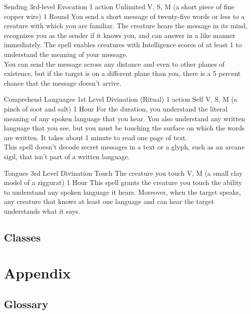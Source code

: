 \documentclass[10pt,twoside,twocolumn,openany,nomultitoc]{book}
\begin{document}
    \DndSpellHeader%
      {Sending}
      {3rd-level Evocation}
      {1 action}
      {Unlimited}
      {V, S, M (a short piece of fine copper wire)}
      {1 Round}
            You send a short message of twenty-five words or less to a creature with which you are familiar. The creature hears the message in its mind, recognizes you as the sender if it knows you, and can answer in a like manner immediately. The spell enables creatures with Intelligence scores of at least 1 to understand the meaning of your message. \\
            You can send the message across any distance and even to other planes of existence, but if the target is on a different plane than you, there is a 5 percent chance that the message doesn't arrive.
        
    \DndSpellHeader%
      {Comprehend Languages}
      {1st Level Divination (Ritual)}
      {1 action}
      {Self}
      {V, S, M (a pinch of soot and salt)}
      {1 Hour}
    For the duration, you understand the literal meaning of any spoken language that you hear. You also understand any written language that you see, but you must be touching the surface on which the words are written. It takes about 1 minute to read one page of text. \\
    This spell doesn’t decode secret messages in a text or a glyph, such as an arcane sigil, that isn’t part of a written language.        
    
    \DndSpellHeader%
      {Tongues}
      {3rd Level Divination}
      {Touch}
      {The creature you touch}
      {V, M (a small clay model of a ziggurat)}
      {1 Hour}
    This spell grants the creature you touch the ability to understand any spoken language it hears. Moreover, when the target speaks, any creature that knows at least one language and can hear the target understands what it says.

            
\section{Classes}

\chapter{Appendix}
\section{Glossary}
\printglossaries
\end{document}
